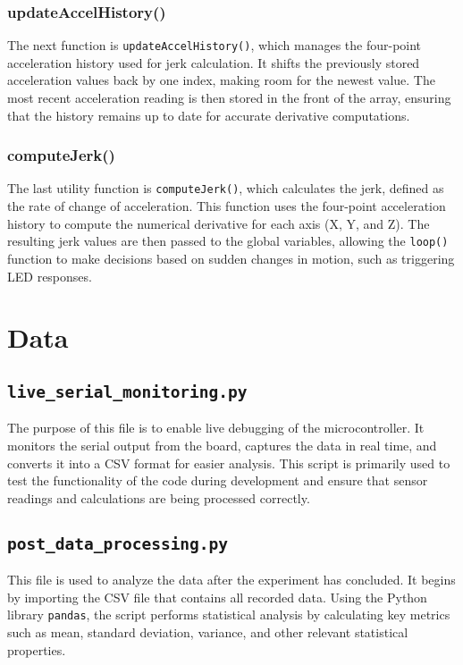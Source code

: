 \documentclass[12pt]{report}
\begin{document}
\subsubsection*{updateAccelHistory()}
The next function is \texttt{updateAccelHistory()}, which manages the four-point acceleration history used for jerk calculation. It shifts the previously stored acceleration values back by one index, making room for the newest value. The most recent acceleration reading is then stored in the front of the array, ensuring that the history remains up to date for accurate derivative computations.

\subsubsection*{computeJerk()}
The last utility function is \texttt{computeJerk()}, which calculates the jerk, defined as the rate of change of acceleration. This function uses the four-point acceleration history to compute the numerical derivative for each axis (X, Y, and Z). The resulting jerk values are then passed to the global variables, allowing the \texttt{loop()} function to make decisions based on sudden changes in motion, such as triggering LED responses.

\section{Data}

\subsection{\texttt{live\_serial\_monitoring.py}}
The purpose of this file is to enable live debugging of the microcontroller. It monitors the serial output from the board, captures the data in real time, and converts it into a CSV format for easier analysis. This script is primarily used to test the functionality of the code during development and ensure that sensor readings and calculations are being processed correctly.

\subsection{\texttt{post\_data\_processing.py}}

This file is used to analyze the data after the experiment has concluded. It begins by importing the CSV file that contains all recorded data. Using the Python library \texttt{pandas}, the script performs statistical analysis by calculating key metrics such as mean, standard deviation, variance, and other relevant statistical properties. \\
\end{document}
